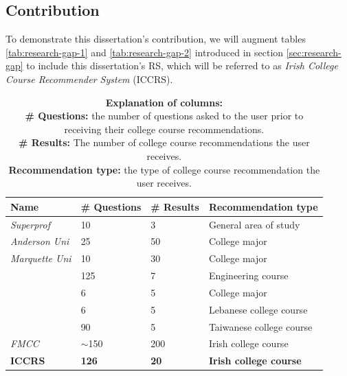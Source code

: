 \subsection{Contribution}

To demonstrate this dissertation's contribution,
we will augment tables \ref{tab:research-gap-1} and \ref{tab:research-gap-2} introduced in section \ref{sec:research-gap}
to include this dissertation's RS, which will be referred to as 
\emph{Irish College Course Recommender System} (ICCRS).

\begin{table}[H]
    \centering
\caption{Comparing features of all examined closely-related work (Part 1)}
\begin{tabular}{ |p{4cm}|p{3cm}|p{3cm}|p{5cm}|}
 \hline
 \textbf{Name} & \textbf{\# Questions} & \textbf{\# Results} & \textbf{Recommendation type}\\
 \hline
\emph{Superprof}    & 10     & 3        & General area of study\\
\hline
\emph{Anderson Uni}     & 25     & 50       & College major\\
\hline
\emph{Marquette Uni}    & 10     & 30       & College major\\
\hline
\emph{\cite{qamhieh2020pcrs}}         & 125 & 7        & Engineering course\\
\hline
\emph{\cite{ghuge2023envisioning}}  & 6      & 5        & College major\\
\hline
\emph{\cite{lahoud2023comparative}}  & 6  & 5     & Lebanese college course\\
\hline
\emph{\cite{su2021personality}}  & 90     & 5  & Taiwanese college course\\
\hline
\emph{FMCC}         & $\sim$150 & 200   & Irish college course\\
\hline
\textbf{ICCRS}         & \textbf{126} & \textbf{20}   & \textbf{Irish college course}\\
\hline
\end{tabular}
\caption*{\textbf{Explanation of columns:}\\\textbf{\# Questions:} the number of questions asked to the user prior to receiving their college course recommendations.\\\textbf{\# Results:} The number of college course recommendations the user receives.\\\textbf{Recommendation type:} the type of college course recommendation the user receives.}
\label{tab:research-gap-1-filled}
\end{table}


